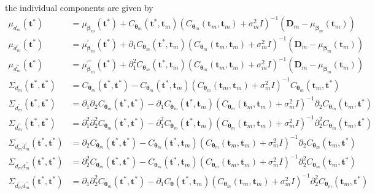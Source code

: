 \documentclass[
  11pt,
]{article}
\theoremstyle{nonumberplain}
\begin{document}
the individual components are given by \begin{align*}
  \mu_{d_m}(\mathbf{t}^\ast) &= \mu_{\bm{\beta}_m}(\mathbf{t}^\ast) + C_{\bm{\theta}_m}(\mathbf{t}^\ast, \mathbf{t}_m)\left(C_{\bm{\theta}_m}(\mathbf{t}_m, \mathbf{t}_m) + \sigma^2_m I\right)^{-1}\left(\mathbf{D}_m - \mu_{\bm{\beta}_m}(\mathbf{t}_m)\right)\\
  \mu_{d_m^\prime}(\mathbf{t}^\ast) &= \mu^\prime_{\bm{\beta}_m}(\mathbf{t}^\ast) + \partial_1 C_{\bm{\theta}_m}(\mathbf{t}^\ast, \mathbf{t}_m)\left(C_{\bm{\theta}_m}(\mathbf{t}_m, \mathbf{t}_m) + \sigma^2_m I\right)^{-1}\left(\mathbf{D}_m - \mu_{\bm{\beta}_m}(\mathbf{t}_m)\right) \\
  \mu_{d_m^{\prime\prime}}(\mathbf{t}^\ast) &= \mu^{\prime\prime}_{\bm{\beta}_m}(\mathbf{t}^\ast) + \partial_1^2 C_{\bm{\theta}_m}(\mathbf{t}^\ast, \mathbf{t}_m)\left(C_{\bm{\theta}_m}(\mathbf{t}_m, \mathbf{t}_m) + \sigma^2_m I\right)^{-1}\left(\mathbf{D}_m - \mu_{\bm{\beta}_m}(\mathbf{t}_m)\right)\\
  \Sigma_{d_m}(\mathbf{t}^\ast, \mathbf{t}^\ast) &= C_{\bm{\theta}_m}(\mathbf{t}^\ast, \mathbf{t}^\ast) - C_{\bm{\theta}_m}(\mathbf{t}^\ast, \mathbf{t}_m)\left(C_{\bm{\theta}_m}(\mathbf{t}_m, \mathbf{t}_m) + \sigma^2_m I\right)^{-1} C_{\bm{\theta}_m}(\mathbf{t}_m, \mathbf{t}^\ast)\\
  \Sigma_{d_m^\prime}(\mathbf{t}^\ast, \mathbf{t}^\ast) &= \partial_1\partial_2C_{\bm{\theta}_m}(\mathbf{t}^\ast, \mathbf{t}^\ast) - \partial_1C_{\bm{\theta}_m}(\mathbf{t}^\ast, \mathbf{t}_m)\left(C_{\bm{\theta}_m}(\mathbf{t}_m, \mathbf{t}_m) + \sigma^2_m I\right)^{-1} \partial_2C_{\bm{\theta}_m}(\mathbf{t}_m, \mathbf{t}^\ast)\\
  \Sigma_{d_m^{\prime\prime}}(\mathbf{t}^\ast, \mathbf{t}^\ast) &= \partial_1^2\partial_2^2 C_{\bm{\theta}_m}(\mathbf{t}^\ast, \mathbf{t}^\ast) - \partial_1^2 C_{\bm{\theta}_m}(\mathbf{t}^\ast, \mathbf{t}_m)\left(C_{\bm{\theta}_m}(\mathbf{t}_m, \mathbf{t}_m) + \sigma^2_m I\right)^{-1} \partial_2^2 C_{\bm{\theta}_m}(\mathbf{t}_m, \mathbf{t}^\ast)\\
  \Sigma_{d_m d_m^\prime}(\mathbf{t}^\ast, \mathbf{t}^\ast) &= \partial_2 C_{\bm{\theta}_m}(\mathbf{t}^\ast, \mathbf{t}^\ast) - C_{\bm{\theta}_m}(\mathbf{t}^\ast, \mathbf{t}_m)\left(C_{\bm{\theta}_m}(\mathbf{t}_m, \mathbf{t}_m) + \sigma^2_m I\right)^{-1} \partial_2 C_{\bm{\theta}_m}(\mathbf{t}_m, \mathbf{t}^\ast)\\
  \Sigma_{d_m d_m^{\prime\prime}}(\mathbf{t}^\ast, \mathbf{t}^\ast) &= \partial_2^2 C_{\bm{\theta}_m}(\mathbf{t}^\ast, \mathbf{t}^\ast) - C_{\bm{\theta}_m}(\mathbf{t}^\ast, \mathbf{t}_m)\left(C_{\bm{\theta}_m}(\mathbf{t}_m, \mathbf{t}_m) + \sigma^2_m I\right)^{-1} \partial_2^2 C_{\bm{\theta}_m}(\mathbf{t}_m, \mathbf{t}^\ast)\\
  \Sigma_{d_m^\prime d_m^{\prime\prime}}(\mathbf{t}^\ast, \mathbf{t}^\ast) &= \partial_1 \partial_2^2 C_{\bm{\theta}_m}(\mathbf{t}^\ast, \mathbf{t}^\ast) - \partial_1 C_{\bm{\theta}}(\mathbf{t}^\ast, \mathbf{t}_m)\left(C_{\bm{\theta}_m}(\mathbf{t}_m, \mathbf{t}_m) + \sigma^2_m I\right)^{-1} \partial_2^2 C_{\bm{\theta}_m}(\mathbf{t}_m, \mathbf{t}^\ast)
\end{align*}
\end{document}
